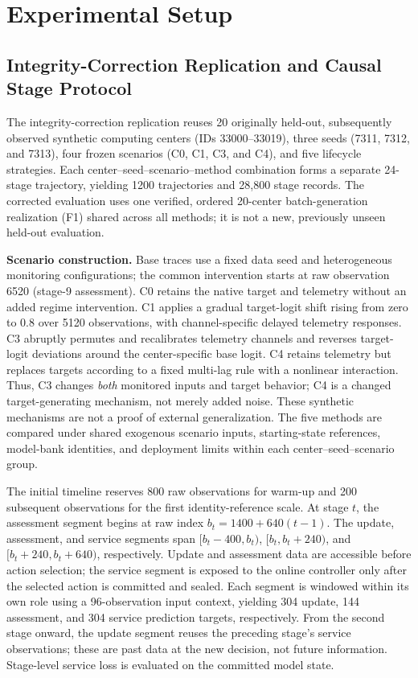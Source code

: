 \documentclass[journal]{IEEEtran}
\begin{document}
\section{Experimental Setup}
\subsection{Integrity-Correction Replication and Causal Stage Protocol}
The integrity-correction replication reuses 20 originally held-out,
subsequently observed synthetic computing centers (IDs 33000--33019),
three seeds (7311, 7312, and 7313), four frozen scenarios (C0, C1,
C3, and C4), and five lifecycle strategies. Each
center--seed--scenario--method combination forms a separate 24-stage
trajectory, yielding 1200 trajectories and 28,800 stage records.
The corrected evaluation uses one verified, ordered 20-center
batch-generation realization (F1) shared across all methods; it is
not a new, previously unseen held-out evaluation.
\par\noindent\textbf{Scenario construction.}
Base traces use a fixed data seed and heterogeneous monitoring configurations; the common intervention starts at raw observation 6520 (stage-9 assessment). C0 retains the native target and telemetry without an added regime intervention. C1 applies a gradual target-logit shift rising from zero to 0.8 over 5120 observations, with channel-specific delayed telemetry responses. C3 abruptly permutes and recalibrates telemetry channels and reverses target-logit deviations around the center-specific base logit. C4 retains telemetry but replaces targets according to a fixed multi-lag rule with a nonlinear interaction. Thus, C3 changes \emph{both} monitored inputs and target behavior; C4 is a changed target-generating mechanism, not merely added noise. These synthetic mechanisms are not a proof of external generalization.
 The five methods are compared under shared exogenous scenario inputs,
starting-state references, model-bank identities, and deployment limits
within each center--seed--scenario group.

The initial timeline reserves 800 raw observations for warm-up and
200 subsequent observations for the first identity-reference scale.
At stage $t$, the assessment segment begins at raw index
$b_t=1400+640(t-1)$. The update, assessment, and service segments
span $[b_t-400,b_t)$, $[b_t,b_t+240)$, and
$[b_t+240,b_t+640)$, respectively. Update and assessment data
are accessible before action selection; the service segment is
exposed to the online controller only after the selected action is
committed and sealed. Each segment is windowed within its own role
using a 96-observation input context, yielding 304 update, 144
assessment, and 304 service prediction targets, respectively.
From the second stage onward, the update segment reuses the preceding
stage's service observations; these are past data at the new decision,
not future information. Stage-level service loss is evaluated on the
committed model state.
\end{document}
